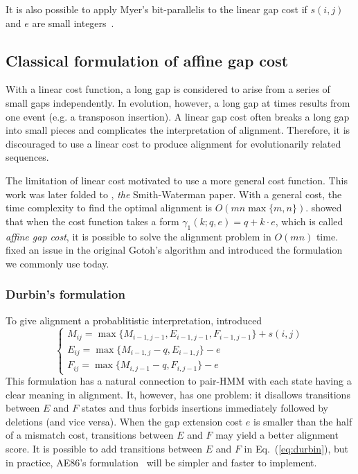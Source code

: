 \documentclass{bioinfo}
\begin{document}
\begin{methods}
It is also possible to apply Myer's bit-parallelis to the linear gap cost
if $s(i,j)$ and $e$ are small integers~\citep{Loving:2014aa}.

\subsection{Classical formulation of affine gap cost}

With a linear cost function, a long gap is considered to arise from a series of
small gaps independently. In evolution, however, a long gap at times results
from one event (e.g. a transposon insertion). A linear gap cost often breaks a
long gap into small pieces and complicates the interpretation of alignment.
Therefore, it is discouraged to use a linear cost to produce alignment for
evolutionarily related sequences.

The limitation of linear cost motivated \citet{Waterman:1976aa} to use a more
general cost function. This work was later folded to \citet{Smith:1981aa},
\emph{the} Smith-Waterman paper. With a general cost, the time complexity to
find the optimal alignment is $O(mn\max\{m,n\})$. \citet{Gotoh:1982aa} showed
that when the cost function takes a form $\gamma_1(k;q,e)=q+k\cdot e$, which is
called \emph{affine gap cost}, it is possible to solve the alignment problem in
$O(mn)$ time. \citet{Altschul:1986aa} fixed an issue in the original Gotoh's
algorithm and introduced the formulation we commonly use today.

\subsubsection{Durbin's formulation}

To give alignment a probablitistic interpretation, \citet{Durbin:1998uq} 
introduced
\begin{equation}\label{eq:durbin}
\left\{\begin{array}{l}
M_{ij}=\max\{M_{i-1,j-1}, E_{i-1,j-1}, F_{i-1,j-1}\} + s(i,j)\\
E_{ij}=\max\{M_{i-1,j}-q, E_{i-1,j}\} - e\\
F_{ij}=\max\{M_{i,j-1}-q, F_{i,j-1}\} - e
\end{array}\right.
\end{equation}
This formulation has a natural connection to pair-HMM with each state having a
clear meaning in alignment. It, however, has one problem: it disallows
transitions between $E$ and $F$ states and thus forbids insertions immediately
followed by deletions (and vice versa). When the gap extension cost $e$ is
smaller than the half of a mismatch cost, transitions between $E$ and $F$ may
yield a better alignment score. It is possible to add transitions between $E$
and $F$ in Eq.~(\ref{eq:durbin}), but in practice, AE86's
formulation~\citep{Altschul:1986aa} will be simpler and faster to implement.


\end{methods}
\end{document}
